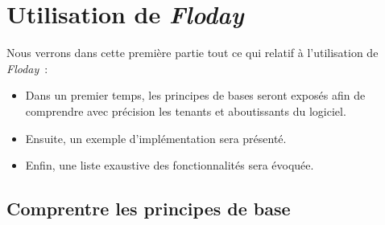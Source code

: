 \section{Utilisation de \emph{Floday}}

\begin{intro}
	Nous verrons dans cette première partie tout ce qui relatif à l'utilisation de \emph{Floday}~:
	\begin{itemize}
		\item Dans un premier temps, les principes de bases seront exposés afin de comprendre avec précision les tenants et aboutissants du logiciel.
		\item Ensuite, un exemple d'implémentation sera présenté.
		\item Enfin, une liste exaustive des fonctionnalités sera évoquée.
	\end{itemize}
\end{intro}

\subsection{Comprentre les principes de base}





